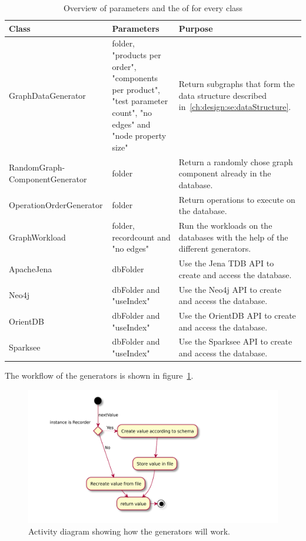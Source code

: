 \begin{table}[h!]
  \begin{minipage}{\textwidth}
    \begin{tabularx}{\textwidth}{ | X | X | X | }
      \hline
      Class & Parameters & Purpose \\ \hline
      GraphDataGenerator & folder, "products per order", "components per product", "test parameter count", "no edges" and "node property size" & Return subgraphs that form the data structure described in~\ref{ch:design:se:dataStructure}. \\ \hline
      RandomGraph-\newline ComponentGenerator & folder & Return a randomly chose graph component already in the database. \\ \hline
      OperationOrderGenerator & folder & Return operations to execute on the database. \\ \hline
      GraphWorkload & folder, recordcount and "no edges" & Run the workloads on the databases with the help of the different generators. \\ \hline
      ApacheJena & dbFolder & Use the Jena TDB API to create and access the database. \\ \hline
      Neo4j & dbFolder and "useIndex" & Use the Neo4j API to create and access the database. \\ \hline
      OrientDB & dbFolder and "useIndex" & Use the OrientDB API to create and access the database. \\ \hline
      Sparksee & dbFolder and "useIndex" & Use the Sparksee API to create and access the database. \\ \hline
    \end{tabularx}
  \end{minipage}
  \caption{Overview of parameters and the of for every class}
  \label{tab:designOverview}
\end{table}

The workflow of the generators is shown in figure~\ref{fig:generalGeneratorWorkflow}.

\begin{figure}[h!]
  \includegraphics[width=\textwidth]{images/generalGeneratorWorkflow}
  \caption{Activity diagram showing how the generators will work.}
  \label{fig:generalGeneratorWorkflow}
\end{figure}

